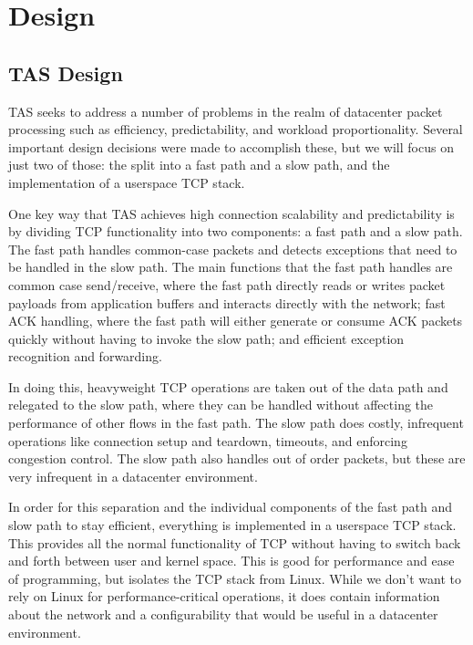 \section{Design}\label{Design}

\subsection{TAS Design}

TAS seeks to address a number of problems in the realm of datacenter packet
processing such as efficiency, predictability, and workload proportionality. 
Several important design decisions were made to accomplish these, but we will 
focus on just two of those: the split into a fast path and a slow path, and the
implementation of a userspace TCP stack.

One key way that TAS achieves high connection scalability and 
predictability is by dividing TCP functionality into two components: a fast 
path and a slow path. The fast path handles common-case packets and detects 
exceptions that need to be handled in the slow path. The main functions that
the fast path handles are common case send/receive, where the fast path directly
reads or writes packet payloads from application buffers and interacts directly
with the network; fast ACK handling, where the fast path will either generate or
consume ACK packets quickly without having to invoke the slow path; and 
efficient exception recognition and forwarding. 

In doing this, heavyweight TCP operations are taken out of the data path and 
relegated to the slow path, where they can be handled without affecting the 
performance of other flows in the fast path. The slow path does costly, 
infrequent operations like connection setup and teardown, timeouts, and 
enforcing congestion control. The slow path also handles out of order packets, 
but these are very infrequent in a datacenter environment.
   
In order for this separation and the individual components of the fast path 
and slow path to stay efficient, everything is implemented in a userspace TCP
stack. This provides all the normal functionality of TCP without having to 
switch back and forth between user and kernel space. This is good for 
performance and ease of programming, but isolates the TCP stack from Linux.
While we don't want to rely on Linux for performance-critical operations, it does contain
information about the network and a configurability that would be useful in a 
datacenter environment.

